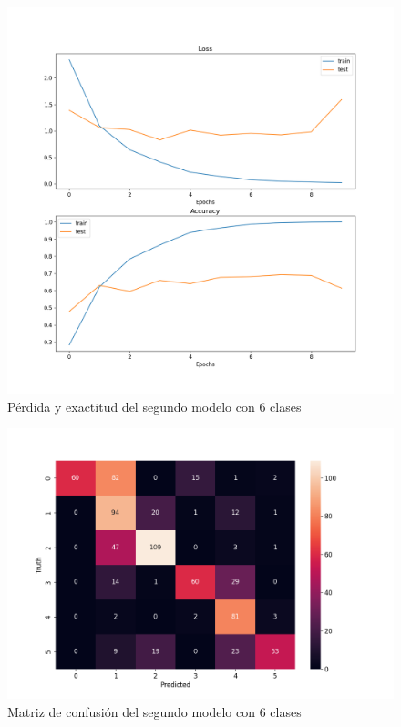 \begin{figure}[H]
	\centering
	\includegraphics[scale=0.65]{figures/LA3.png}
	\caption{Pérdida y exactitud del segundo modelo con 6 clases}
	\label{fig:img15}
\end{figure}

\begin{figure}[H]
	\centering
	\includegraphics[scale=0.75]{figures/CM3.png}
	\caption{Matriz de confusión del segundo modelo con 6 clases}
	\label{fig:img16}
\end{figure}


